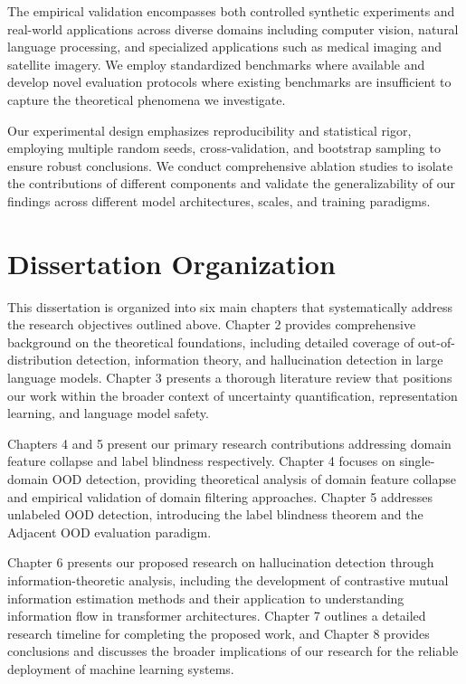 \documentclass[11pt, oneside]{book}
\theoremstyle{plain}
\theoremstyle{definition}
\theoremstyle{remark}
\begin{document}
The empirical validation encompasses both controlled synthetic experiments and real-world applications across diverse domains including computer vision, natural language processing, and specialized applications such as medical imaging and satellite imagery. We employ standardized benchmarks where available and develop novel evaluation protocols where existing benchmarks are insufficient to capture the theoretical phenomena we investigate.

Our experimental design emphasizes reproducibility and statistical rigor, employing multiple random seeds, cross-validation, and bootstrap sampling to ensure robust conclusions. We conduct comprehensive ablation studies to isolate the contributions of different components and validate the generalizability of our findings across different model architectures, scales, and training paradigms.

\section{Dissertation Organization}

This dissertation is organized into six main chapters that systematically address the research objectives outlined above. Chapter 2 provides comprehensive background on the theoretical foundations, including detailed coverage of out-of-distribution detection, information theory, and hallucination detection in large language models. Chapter 3 presents a thorough literature review that positions our work within the broader context of uncertainty quantification, representation learning, and language model safety.

Chapters 4 and 5 present our primary research contributions addressing domain feature collapse and label blindness respectively. Chapter 4 focuses on single-domain OOD detection, providing theoretical analysis of domain feature collapse and empirical validation of domain filtering approaches. Chapter 5 addresses unlabeled OOD detection, introducing the label blindness theorem and the Adjacent OOD evaluation paradigm.

Chapter 6 presents our proposed research on hallucination detection through information-theoretic analysis, including the development of contrastive mutual information estimation methods and their application to understanding information flow in transformer architectures. Chapter 7 outlines a detailed research timeline for completing the proposed work, and Chapter 8 provides conclusions and discusses the broader implications of our research for the reliable deployment of machine learning systems.
\end{document}
